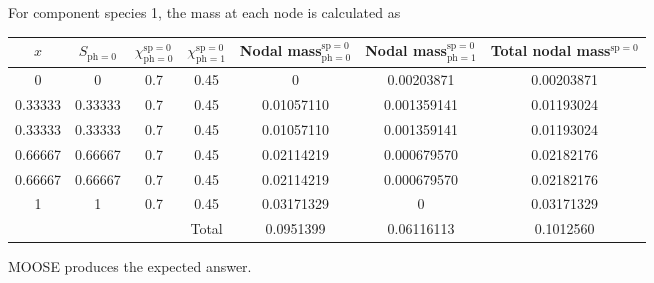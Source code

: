 \documentclass[]{scrreprt}
\def\species{\mathrm{sp}}
\def\phase{\mathrm{ph}}
\def\massfrac{\chi}
\begin{document}
For component species 1, the mass at each node is calculated as
\begin{center}
\begin{tabular}{|ccccccc|}
\hline
$x$ & $S_{\phase=0}$ & $\massfrac_{\phase=0}^{\species=0}$ & $\massfrac_{\phase=1}^{\species=0}$
& Nodal mass$_{\phase=0}^{\species=0}$ & Nodal mass$_{\phase=1}^{\species=0}$ & Total nodal mass$^{\species=0}$ \\
\hline
0 & 0 & 0.7 & 0.45 & 0 & 0.00203871 & 0.00203871 \\
0.33333 & 0.33333 & 0.7 & 0.45 & 0.01057110 & 0.001359141& 0.01193024\\
0.33333 & 0.33333 & 0.7 & 0.45 & 0.01057110 & 0.001359141 & 0.01193024 \\
0.66667 & 0.66667 & 0.7 & 0.45 & 0.02114219 & 0.000679570 & 0.02182176 \\
0.66667 & 0.66667 & 0.7 & 0.45 & 0.02114219 & 0.000679570 & 0.02182176 \\
1 & 1 & 0.7 & 0.45 & 0.03171329 & 0 & 0.03171329 \\
\hline
 & & & Total & 0.0951399 & 0.06116113 & 0.1012560 \\
\hline
\end{tabular}
\end{center}

MOOSE produces the expected answer.
\end{document}
